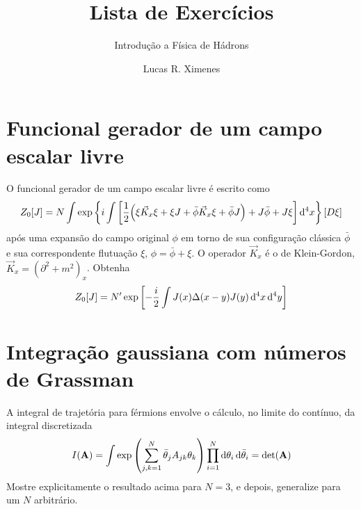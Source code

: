 \documentclass[a4paper, 11pt, oneside]{impression}
\title{Lista de Exercícios} %
\subtitle{Introdução a Física de Hádrons} %
\author{Lucas R. Ximenes} %
\begin{document}
\maketitle

\chapter{Funcional gerador de um campo escalar livre}\label{quest: one}

\begin{exercise}{}
    O funcional gerador de um campo escalar livre é escrito como
        \begin{equation*}
            Z_{0}[J] = N \int \exp\qty{
                i \int \qty[
                    \dfrac{1}{2}\qty(
                        \xi\vec{K}_{x}\xi +
                        \xi J +
                        \bar{\phi}\vec{K}_{x}\xi + 
                        \bar{\phi}J
                    ) + 
                    J\bar{\phi} + 
                    J\xi
                ]\dd[4]{x}
            }[D\xi]
        \end{equation*}
    após uma expansão do campo original $\phi$ em torno de sua configuração clássica $\bar{\phi}$ e sua correspondente flutuação $\xi$, $\phi = \bar{\phi} + \xi$. O operador $\vec{K}_{x}$ é o de Klein-Gordon, $\vec{K}_{x} = (\partial^{2} + m^{2})_{x}$. Obtenha
        \begin{equation*}
            Z_{0}[J] = N'\exp\qty[
                -\dfrac{i}{2}\int J(x)\Delta(x-y)J(y)\dd[4]{x}\dd[4]{y}
            ]
        \end{equation*}
\end{exercise}



\chapter{Integração gaussiana com números de Grassman}\label{quest: two}

\begin{exercise}{}
    A integral de trajetória para férmions envolve o cálculo, no limite do contínuo, da integral discretizada
        \begin{equation*}
            I(\vb{A}) = \int \exp\qty(\sum_{j,k=1}^{N}\bar{\theta}_{j}A_{jk}\theta_{k})\prod_{i=1}^{N}\dd{\theta_{i}}\dd{\bar{\theta}_{i}} = \text{det}(\vb{A})
        \end{equation*}
    Mostre explicitamente o resultado acima para $N = 3$, e depois, generalize para um $N$ arbitrário.
\end{exercise}
\end{document}
